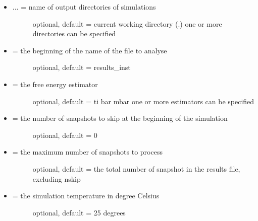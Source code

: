 \documentclass[letterpaper,10pt,english]{manual}
\begin{document}
\begin{itemize}
\item {} \begin{description}
\item[{ ... = name of output directories of simulations}] \leavevmode
optional, default = current working directory (.)
one or more directories can be specified

\end{description}

\item {} \begin{description}
\item[{ = the beginning of the name of the file to analyse}] \leavevmode
optional, default = results\_inst

\end{description}

\item {} \begin{description}
\item[{ = the free energy estimator}] \leavevmode
optional, default = ti bar mbar
one or more estimators can be specified

\end{description}

\item {} \begin{description}
\item[{ = the number of snapshots to skip at the beginning of the simulation}] \leavevmode
optional, default = 0

\end{description}

\item {} \begin{description}
\item[{ = the maximum number of snapshots to process}] \leavevmode
optional, default = the total number of snapshot in the results file, excluding nskip

\end{description}

\item {} \begin{description}
\item[{ = the simulation temperature in degree Celsius}] \leavevmode
optional, default = 25 degrees


\end{description}
\end{itemize}
\end{document}
